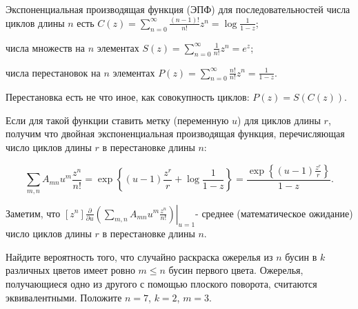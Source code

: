 \begin{ordre}
 Экспоненциальная производящая функция (ЭПФ) для последовательностей числа циклов длины $n$ есть $C(z)=\sum _{n=0}^{\infty }\frac{(n-1)!}{n!} z^{n}  =\log \frac{1}{1-z} $;

числа множеств на $n$ элементах $S(z)=\sum _{n=0}^{\infty }\frac{1}{n!} z^{n}  =e^{z} $;

числа перестановок на $n$ элементах $P(z)=\sum _{n=0}^{\infty }\frac{n!}{n!} z^{n}  =\frac{1}{1-z} $.

Перестановка есть не что иное, как совокупность циклов: $P(z)=S\left(C(z)\right)$.

Если для такой функции ставить метку (переменную $u$) для циклов длины $r$, получим что двойная экспоненциальная производящая функция, перечисляющая число циклов длины $r$ в перестановке длины $n$:

\[\sum _{m,n}^{}A_{mn} u^{m}  \frac{z^{n} }{n!} =\exp \left\{(u-1)\frac{z^{r} }{r} +\log \frac{1}{1-z} \right\}=\frac{\exp \left\{(u-1)\frac{z^{r} }{r} \right\}}{1-z} .\] 

Заметим, что $\left[z^{n} \right]\left. \frac{\partial }{\partial u} \left(\sum _{m,n}^{}A_{mn} u^{m}  \frac{z^{n} }{n!} \right)\right|_{u=1} $- среднее (математическое ожидание) число циклов длины $r$ в перестановке длины $n$.
\end{ordre}





\begin{problem}[Ожерелья]

Найдите вероятность того, что случайно раскраска ожерелья из $n$ бусин в $k$ различных цветов имеет ровно $m\le n$ бусин первого цвета. Ожерелья, получающиеся одно из другого с помощью плоского поворота, считаются эквивалентными. Положите $n=7$, $k=2$, $m=3$.

\end{problem}

